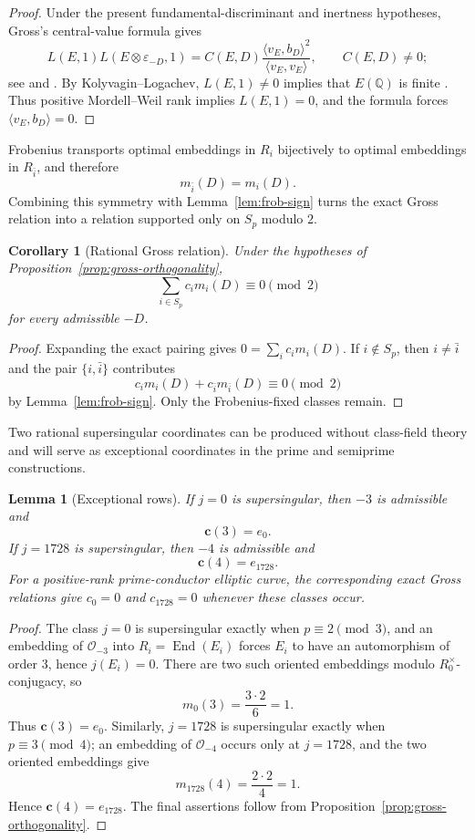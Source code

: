 \documentclass[10pt,a4paper]{amsart}
\newtheorem{lemma}[theorem]{Lemma}
\newtheorem{corollary}[theorem]{Corollary}
\newcommand{\Q}{\mathbb{Q}}
\newcommand{\OO}{\mathcal{O}}
\newcommand{\End}{\operatorname{End}}
\newcommand{\crow}{\mathbf{c}}
\begin{document}
\begin{proof}
Under the present fundamental-discriminant and inertness hypotheses, Gross's central-value formula gives
\[
  L(E,1)L(E\otimes\varepsilon_{-D},1)
  =C(E,D)\frac{\langle v_E,b_D\rangle^2}{\langle v_E,v_E\rangle},
  \qquad C(E,D)\ne0;
\]
see \cite[Proposition~13.5]{Gross1987} and \cite[Proposition~24]{KazalickiKohen2017}.  By Kolyvagin--Logachev, $L(E,1)\ne0$ implies that $E(\Q)$ is finite \cite[Theorem~0.3]{KolyvaginLogachev1990}.  Thus positive Mordell--Weil rank implies $L(E,1)=0$, and the formula forces $\langle v_E,b_D\rangle=0$.
\end{proof}

Frobenius transports optimal embeddings in $R_i$ bijectively to optimal embeddings in $R_{\bar i}$, and therefore
\[
  m_{\bar i}(D)=m_i(D).
\]
Combining this symmetry with Lemma~\ref{lem:frob-sign} turns the exact Gross relation into a relation supported only on $S_p$ modulo $2$.

\begin{corollary}[Rational Gross relation]\label{cor:rational-relation}
Under the hypotheses of Proposition~\ref{prop:gross-orthogonality},
\[
  \sum_{i\in S_p}c_i m_i(D)\equiv0\pmod2
\]
for every admissible $-D$.
\end{corollary}

\begin{proof}
Expanding the exact pairing gives $0=\sum_i c_i m_i(D)$.  If $i\notin S_p$, then $i\ne\bar i$ and the pair $\{i,\bar i\}$ contributes
\[
  c_i m_i(D)+c_{\bar i}m_{\bar i}(D)\equiv0\pmod2
\]
by Lemma~\ref{lem:frob-sign}.  Only the Frobenius-fixed classes remain.
\end{proof}

Two rational supersingular coordinates can be produced without class-field theory and will serve as exceptional coordinates in the prime and semiprime constructions.

\begin{lemma}[Exceptional rows]\label{lem:exceptional-rows}
If $j=0$ is supersingular, then $-3$ is admissible and
\[
  \crow(3)=e_0.
\]
If $j=1728$ is supersingular, then $-4$ is admissible and
\[
  \crow(4)=e_{1728}.
\]
For a positive-rank prime-conductor elliptic curve, the corresponding exact Gross relations give $c_0=0$ and $c_{1728}=0$ whenever these classes occur.
\end{lemma}

\begin{proof}
The class $j=0$ is supersingular exactly when $p\equiv2\pmod3$, and an
embedding of $\OO_{-3}$ into $R_i=\End(E_i)$ forces $E_i$ to have an
automorphism of order $3$, hence $j(E_i)=0$.  There are two such oriented
embeddings modulo $R_0^\times$-conjugacy, so
\[
  m_0(3)=\frac{3\cdot2}{6}=1.
\]
Thus $\crow(3)=e_0$.  Similarly, $j=1728$ is supersingular exactly when
$p\equiv3\pmod4$; an embedding of $\OO_{-4}$ occurs only at $j=1728$, and
the two oriented embeddings give
\[
  m_{1728}(4)=\frac{2\cdot2}{4}=1.
\]
Hence $\crow(4)=e_{1728}$.  The final assertions follow from
Proposition~\ref{prop:gross-orthogonality}.
\end{proof}
\end{document}

